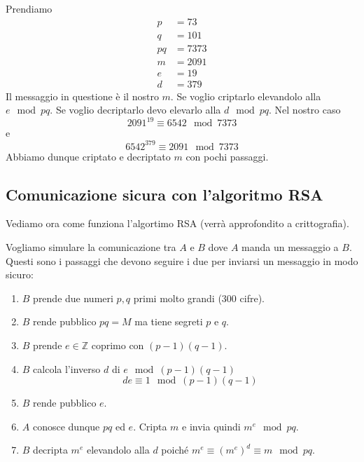 \begin{example}
	Prendiamo
	\begin{equation*}
		\begin{array}{ll}
			p  & = 73   \\
			q  & = 101  \\
			pq & = 7373 \\
			m  & = 2091 \\
			e  & = 19   \\
			d  & = 379
		\end{array}
	\end{equation*}
	Il messaggio in questione \`e il nostro $m$. Se voglio criptarlo
	elevandolo alla $e \mod{pq}$. Se voglio decriptarlo devo elevarlo alla $d \mod{pq}$.
	Nel nostro caso
	\begin{equation*}
		2091^{19} \equiv 6542 \mod{7373}
	\end{equation*}
	e
	\begin{equation*}
		6542^{379} \equiv 2091 \mod{7373}
	\end{equation*}
	Abbiamo dunque criptato e decriptato $m$ con pochi passaggi.
\end{example}

\subsection{Comunicazione sicura con l'algoritmo RSA}
Vediamo ora come funziona l'algortimo RSA (verr\`a approfondito a crittografia).

Vogliamo simulare la comunicazione tra $A$ e $B$ dove $A$ manda un messaggio a $B$.
Questi sono i passaggi che devono seguire i due per inviarsi un messaggio in modo sicuro:
\begin{enumerate}
	\item $B$ prende due numeri $p, q$ primi molto grandi (300 cifre).
	\item $B$ rende pubblico $pq = M$ ma tiene segreti $p$ e $q$.
	\item $B$ prende $e \in \mathbb{Z}$ coprimo con $(p - 1)(q - 1)$.
	\item $B$ calcola l'inverso $d$ di $e \mod{(p - 1)(q - 1)}$
	      \begin{equation*}
		      de \equiv 1 \mod{(p - 1)(q - 1)}
	      \end{equation*}
	\item $B$ rende pubblico $e$.
	\item $A$ conosce dunque $pq$ ed $e$. Cripta $m$ e invia quindi $m^e \mod{pq}$.
	\item $B$ decripta $m^e$ elevandolo alla $d$ poich\'e $m^e \equiv (m^e)^d \equiv m \mod{pq}$.
\end{enumerate}